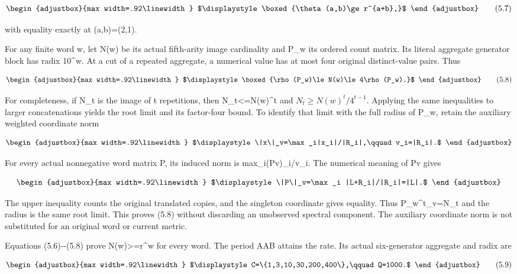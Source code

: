 \[
\begin{adjustbox}{max width=.92\linewidth}
$\displaystyle \boxed{\theta(a,b)\ge r^{a+b},}$
\end{adjustbox}
\tag{5.7}
\]

with equality exactly at (a,b)=(2,1).

For any finite word w, let N(w) be its actual fifth-arity image cardinality and P\_w its ordered count matrix. Its literal aggregate generator block has radix 10\^{}\textbar w\textbar. At a cut of a repeated aggregate, a numerical value has at most four original distinct-value pairs. Thus

\[
\begin{adjustbox}{max width=.92\linewidth}
$\displaystyle \boxed{\rho(P_w)\le N(w)\le4\rho(P_w).}$
\end{adjustbox}
\tag{5.8}
\]

For completeness, if N\_t is the image of t repetitions, then N\_t\textless=N(w)\^{}t and \(N_t\ge N(w)^t/4^{t-1}\). Applying the same inequalities to larger concatenations yields the root limit and its factor-four bound. To identify that limit with the full radius of P\_w, retain the auxiliary weighted coordinate norm

\[
\begin{adjustbox}{max width=.92\linewidth}
$\displaystyle \|x\|_v=\max_i|x_i|/|R_i|,\qquad v_i=|R_i|.$
\end{adjustbox}
\]

For every actual nonnegative word matrix P, its induced norm is max\_i(Pv)\_i/v\_i. The numerical meaning of Pv gives

\[
\begin{adjustbox}{max width=.92\linewidth}
$\displaystyle \|P\|_v=\max_i |L+R_i|/|R_i|=|L|.$
\end{adjustbox}
\]

The upper inequality counts the original translated copies, and the singleton coordinate gives equality. Thus \textbar P\_w\^{}t\textbar\_v=N\_t and the radius is the same root limit. This proves (5.8) without discarding an unobserved spectral component. The auxiliary coordinate norm is not substituted for an original word or current metric.

Equations (5.6)-\/-(5.8) prove N(w)\textgreater=r\^{}\textbar w\textbar{} for every word. The period AAB attains the rate. Its actual six-generator aggregate and radix are

\[
\begin{adjustbox}{max width=.92\linewidth}
$\displaystyle C=\{1,3,10,30,200,400\},\qquad Q=1000.$
\end{adjustbox}
\tag{5.9}
\]

